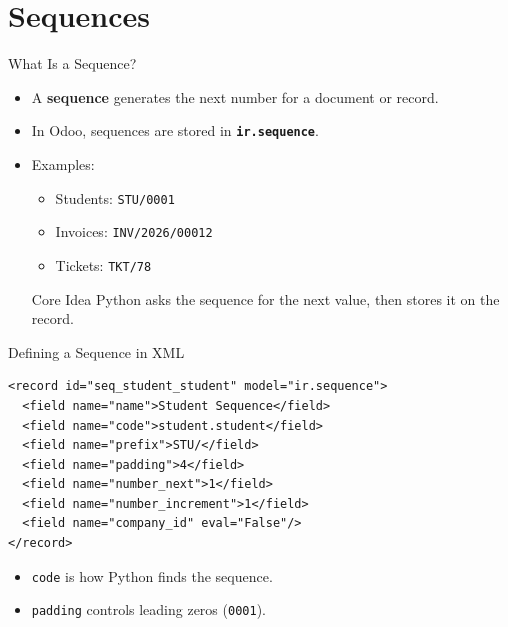 \section{Sequences}


\begin{frame}[fragile]{What Is a Sequence?}
	\begin{itemize}
		\item A \textbf{sequence} generates the next number for a document or record.
		\item In Odoo, sequences are stored in \textbf{\texttt{ir.sequence}}.
		\item Examples:
		\begin{itemize}
			\item Students: \texttt{STU/0001}
			\item Invoices: \texttt{INV/2026/00012}
			\item Tickets: \texttt{TKT/78}
		\end{itemize}
\begin{block}{Core Idea}
	Python asks the sequence for the next value, then stores it on the record.
\end{block}
	\end{itemize}
\end{frame}

\begin{frame}[fragile]{Defining a Sequence in XML}
\begin{lstlisting}[style=xml]
<record id="seq_student_student" model="ir.sequence">
  <field name="name">Student Sequence</field>
  <field name="code">student.student</field>
  <field name="prefix">STU/</field>
  <field name="padding">4</field>
  <field name="number_next">1</field>
  <field name="number_increment">1</field>
  <field name="company_id" eval="False"/>
</record>
\end{lstlisting}
	\begin{itemize}
		\item \texttt{code} is how Python finds the sequence.
		\item \texttt{padding} controls leading zeros (\texttt{0001}).
	\end{itemize}
\end{frame}


